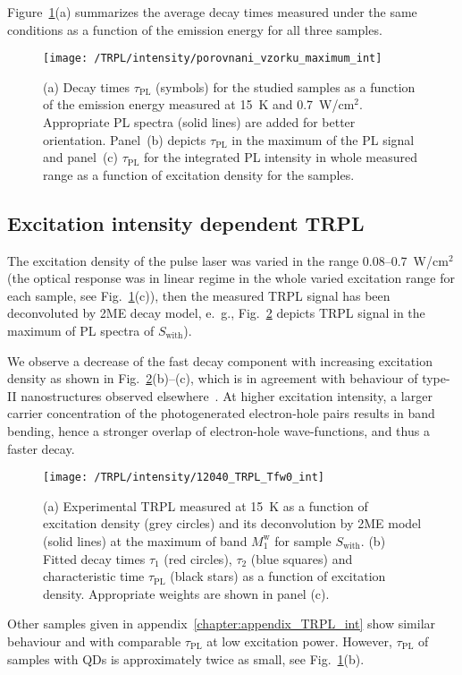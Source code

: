 Figure~\ref{fig:TRPL_int_all}(a) summarizes the average decay times measured under the same conditions as a function of the emission energy for all three samples. 
%
\begin{figure}
\centering
\texttt{[image: /TRPL/intensity/porovnani\_vzorku\_maximum\_int]}
\caption{(a) Decay times $\tau_\mathrm{PL}$ (symbols) for the studied samples as a function of the emission energy measured at 15~K and 0.7~W/cm$^2$. Appropriate PL spectra (solid lines) are added for better orientation. Panel~(b) depicts $\tau_\mathrm{PL}$ in the maximum of the PL signal and panel~(c) $\tau_\mathrm{PL}$ for the integrated PL intensity in whole measured range as a function of excitation density for the samples.}
\label{fig:TRPL_int_all}
\end{figure}


\subsection{Excitation intensity dependent TRPL}
The excitation density of the pulse laser was varied in the range 0.08--0.7~W/cm$^2$ (the optical response was in linear regime in the whole varied excitation range for each sample, see Fig.~\ref{fig:TRPL_int_all}(c)), then the measured TRPL signal has been deconvoluted by 2ME decay model, e.~g., Fig.~\ref{fig:TRPL_int_w} depicts TRPL signal in the maximum of PL spectra of $S_\mathrm{with}$). 

We observe a decrease of the fast decay component with increasing excitation density as shown in Fig.~\ref{fig:TRPL_int_w}(b)--(c), which is in agreement with behaviour of type-II nanostructures observed elsewhere~\citep{Ledentsov_prb1995_intmodel,Gu_prb2005_TRPLtype2,Manna_apl2012_TRPLtype2,Zaitsev_prb2007}. At higher excitation intensity, a larger carrier concentration of the photogenerated electron-hole pairs results in band bending, hence a stronger overlap of electron-hole wave-functions, and thus a faster decay.
%

\begin{figure}
	\centering
	\texttt{[image: /TRPL/intensity/12040\_TRPL\_Tfw0\_int]}
	\caption{(a) Experimental TRPL measured at 15~K as a function of excitation density (grey circles) and its deconvolution by 2ME model (solid lines) at the maximum of band $M_1^\mathrm{w}$ for sample $S_\mathrm{with}$. (b) Fitted decay times $\tau_1$ (red circles), $\tau_2$ (blue squares) and characteristic time $\tau_\mathrm{PL}$ (black stars) as a function of excitation density. Appropriate weights are shown in panel (c).}
	\label{fig:TRPL_int_w}
\end{figure}
Other samples given in appendix~\ref{chapter:appendix_TRPL_int} show similar behaviour and with comparable $\tau_\mathrm{PL}$ at low excitation power. However, $\tau_\mathrm{PL}$ of samples with QDs is approximately twice as small, see Fig.~\ref{fig:TRPL_int_all}(b).

